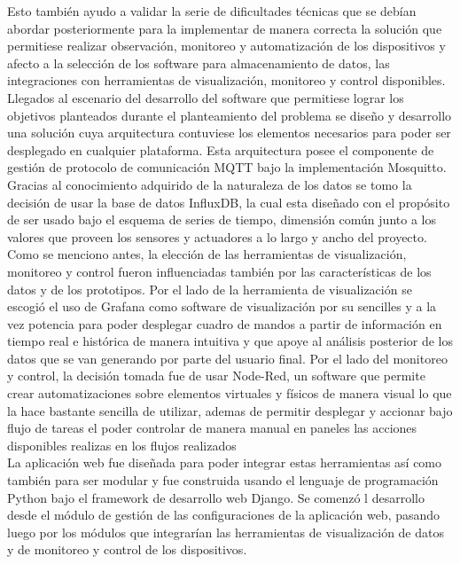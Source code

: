 Esto también ayudo a validar la serie de dificultades técnicas que se debían abordar posteriormente para la implementar de manera correcta la solución que permitiese realizar observación, monitoreo y automatización de los dispositivos y afecto a la selección de los software para almacenamiento de datos, las integraciones con herramientas de visualización, monitoreo y control disponibles.\\

Llegados al escenario del desarrollo del software que permitiese lograr los objetivos planteados durante el planteamiento del problema se diseño y desarrollo una solución cuya arquitectura contuviese los elementos necesarios para poder ser desplegado en cualquier plataforma. Esta arquitectura posee el componente de gestión de protocolo de comunicación MQTT bajo la implementación Mosquitto. Gracias al conocimiento adquirido de la naturaleza de los datos se tomo la decisión de usar la base de datos InfluxDB, la cual esta diseñado con el propósito de ser usado bajo el esquema de series de tiempo, dimensión común junto a los valores que proveen los sensores y actuadores a lo largo y ancho del proyecto.\\

Como se menciono antes, la elección de las herramientas de visualización, monitoreo y control fueron influenciadas también por las características de los datos y de los prototipos. Por el lado de la herramienta de visualización se escogió el uso de Grafana como software de visualización por su sencilles y a la vez potencia para poder desplegar cuadro de mandos a partir de información en tiempo real e histórica de manera intuitiva y que apoye al análisis posterior de los datos que se van generando por parte del usuario final. Por el lado del monitoreo y control, la decisión tomada fue de usar Node-Red, un software que permite crear automatizaciones sobre elementos virtuales y físicos de manera visual lo que la hace bastante sencilla de utilizar, ademas de permitir desplegar y accionar bajo flujo de tareas el poder controlar de manera manual en paneles las acciones disponibles realizas en los flujos realizados\\

La aplicación web fue diseñada para poder integrar estas herramientas así como también para ser modular y fue construida usando el lenguaje de programación Python bajo el framework de desarrollo web Django. Se comenzó l desarrollo desde el módulo de gestión de las configuraciones de la aplicación web, pasando luego por los módulos que integrarían las herramientas de visualización de datos y de monitoreo y control de los dispositivos.\\

